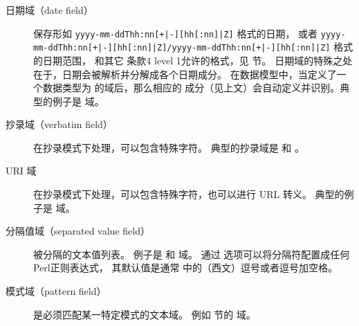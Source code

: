 \begin{description}
\begin{description}
\item[日期域（date field）] 保存形如 \texttt{yyyy-mm-ddThh:nn[+|-][hh[:nn]|Z]} 格式的日期，
或者 \texttt{yyyy-mm-ddThh:nn[+|-][hh[:nn]|Z]/yyyy-mm-ddThh:nn[+|-][hh[:nn]|Z]} 格式的日期范围，
和其它 条款4 level 1允许的格式，见  节。
日期域的特殊之处在于，日期会被解析并分解成各个日期成分。
在数据模型中，当定义了一个数据类型为  的域后，那么相应的  成分（见上文）会自动定义并识别。典型的例子是  域。


\item[抄录域（verbatim field）] 在抄录模式下处理，可以包含特殊字符。
典型的抄录域是  和 。

\item[URI 域] 在抄录模式下处理，可以包含特殊字符，也可以进行 URL 转义。
典型的例子是  域。


\item[分隔值域（separated value field）]
被分隔的文本值列表。
例子是  和  域。
通过  选项可以将分隔符配置成任何Perl正则表达式，
其默认值是通常 \BibTeX 中的（西文）逗号或者逗号加空格。


\item[模式域（pattern field）] 是必须匹配某一特定模式的文本域。
例如  节的  域。



\end{description}
\end{description}
